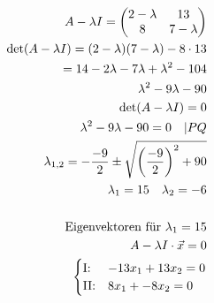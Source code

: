 \begin{align*}
    A - \lambda I =
    \begin{pmatrix}
        2 - \lambda & 13          \\
        8           & 7 - \lambda
    \end{pmatrix}                                                    \\
    \det(A - \lambda I) = (2 - \lambda) (7 - \lambda) - 8 \cdot 13               \\
    = 14 - 2\lambda -7\lambda +\lambda^2 - 104                                   \\
    \lambda^2 - 9\lambda -90                                                     \\
    \det(A - \lambda I) = 0                                                      \\
    \lambda^2 - 9\lambda -90 = 0 \quad | PQ                                      \\
    \lambda_{1, 2} = -\frac{-9}{2} \pm \sqrt{{\left(\frac{-9}{2}\right)}^2 + 90} \\
    \lambda_1 = 15 \quad \lambda_2 = -6                                          \\\\
    \text{Eigenvektoren für } \lambda_1 = 15                                     \\
    A - \lambda I \cdot \vec{x} = 0                                              \\
    \begin{cases}
        \text{I:\@}  & -13x_1 + 13x_2 = 0 \\
        \text{II:\@} & 8x_1 + -8x_2 = 0   \\
    \end{cases}
\end{align*}

